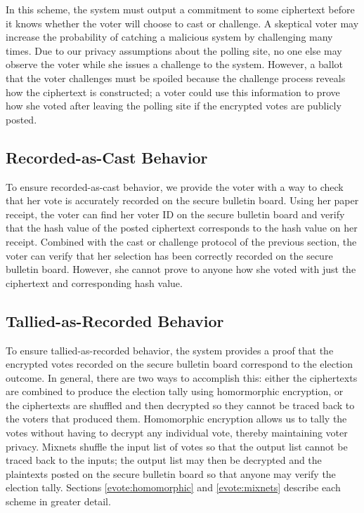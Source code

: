 In this scheme, the system must output a commitment to some ciphertext before it knows whether the voter will choose to cast or challenge. A skeptical voter may increase the probability of catching a malicious system by challenging many times. Due to our privacy assumptions about the polling site, no one else may observe the voter while she issues a challenge to the system. However, a ballot that the voter challenges must be spoiled because the challenge process reveals how the ciphertext is constructed; a voter could use this information to prove how she voted after leaving the polling site if the encrypted votes are publicly posted.

\subsection{Recorded-as-Cast Behavior} \label{evote:design:recordedascast}

To ensure recorded-as-cast behavior, we provide the voter with a way to check that her vote is accurately recorded on the secure bulletin board. Using her paper receipt, the voter can find her voter ID on the secure bulletin board and verify that the hash value of the posted ciphertext corresponds to the hash value on her receipt. Combined with the cast or challenge protocol of the previous section, the voter can verify that her selection has been correctly recorded on the secure bulletin board. However, she cannot prove to anyone how she voted with just the ciphertext and corresponding hash value.

\subsection{Tallied-as-Recorded Behavior} \label{evote:design:talliedasrecorded}

To ensure tallied-as-recorded behavior, the system provides a proof that the encrypted votes recorded on the secure bulletin board correspond to the election outcome. In general, there are two ways to accomplish this: either the ciphertexts are combined to produce the election tally using homormorphic encryption, or the ciphertexts are shuffled and then decrypted so they cannot be traced back to the voters that produced them. Homomorphic encryption allows us to tally the votes without having to decrypt any individual vote, thereby maintaining voter privacy. Mixnets shuffle the input list of votes so that the output list cannot be traced back to the inputs; the output list may then be decrypted and the plaintexts posted on the secure bulletin board so that anyone may verify the election tally. Sections \ref{evote:homomorphic} and \ref{evote:mixnets} describe each scheme in greater detail.

